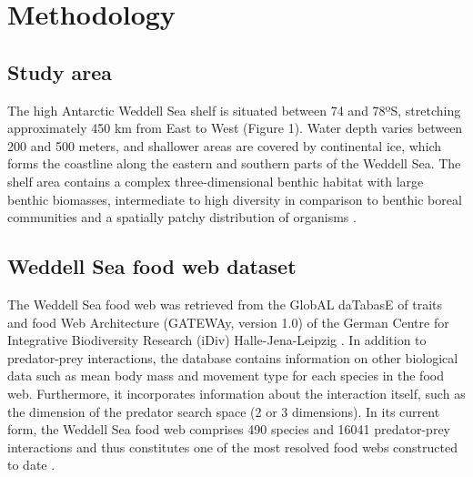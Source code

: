 \documentclass[gc, manuscript]{copernicus}
\begin{document}
\section{Methodology}

\subsection{Study area}

The high Antarctic Weddell Sea shelf is situated between 74 and 78ºS,
stretching approximately 450 km from East to West (Figure 1). Water
depth varies between 200 and 500 meters, and shallower areas are covered
by continental ice, which forms the coastline along the eastern and
southern parts of the Weddell Sea. The shelf area contains a complex
three-dimensional benthic habitat with large benthic biomasses,
intermediate to high diversity in comparison to benthic boreal
communities and a spatially patchy distribution of organisms
\citep{Dayton1990, Teixido2002}.

\subsection{Weddell Sea food web dataset}

The Weddell Sea food web was retrieved from the GlobAL daTabasE of
traits and food Web Architecture (GATEWAy, version 1.0) of the German
Centre for Integrative Biodiversity Research (iDiv) Halle-Jena-Leipzig
\citep{Brose2018}. In addition to predator-prey interactions, the
database contains information on other biological data such as mean body
mass and movement type for each species in the food web. Furthermore, it
incorporates information about the interaction itself, such as the
dimension of the predator search space (2 or 3 dimensions). In its
current form, the Weddell Sea food web comprises 490 species and 16041
predator-prey interactions and thus constitutes one of the most resolved
food webs constructed to date \citep{Jacob2011}.
\end{document}
